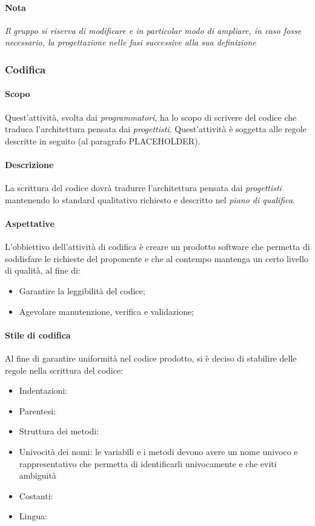 \documentclass[../norme_di_progetto.tex]{subfiles}
\begin{document}
  \paragraph{Nota}
  \emph{Il gruppo si riserva di modificare e in particolar modo di ampliare, in caso fosse necessario, la progettazione nelle fasi successive alla sua definizione}
  
  \subsubsection{Codifica}
 
 \paragraph{Scopo}
    Quest'attività, svolta dai \emph{programmatori}, ha lo scopo di scrivere del codice che traduca l'architettura pensata dai \emph{progettisti}. Quest'attività è soggetta alle regole descritte in seguito (al paragrafo PLACEHOLDER).
 
 \paragraph{Descrizione}
 La scrittura del codice dovrà tradurre l'architettura pensata dai \emph{progettisti} mantenendo lo standard qualitativo richiesto e descritto nel \emph{piano di qualifica}.
 
 \paragraph{Aspettative}
 L'obbiettivo dell'attività di codifica è creare un prodotto software che permetta di soddisfare le richieste del proponente e che al contempo mantenga un certo livello di qualità, al fine di:
 \begin{itemize}
     \item Garantire la leggibilità del codice;
     \item Agevolare manutenzione, verifica e validazione;
 \end{itemize}
 
 
 \paragraph{Stile di codifica}
 Al fine di garantire uniformità nel codice prodotto, si è deciso di stabilire delle regole nella scrittura del codice:
 \begin{itemize}
     \item Indentazioni:
     \item Parentesi:
     \item Struttura dei metodi:
     \item Univocità dei nomi: le variabili e i metodi devono avere un nome univoco e rappresentativo che permetta di identificarli univocamente e che eviti ambiguità
     \item Costanti:
     \item Lingua:
 \end{itemize}
 
\end{document}
